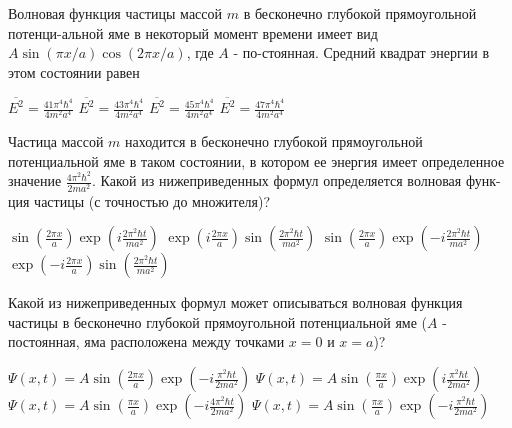 \documentclass[11pt,a4paper]{exam}
\begin{document}
\begin{questions}
\question Волновая функция частицы массой $m$ в бесконечно глубокой прямоугольной потенци-альной яме в некоторый момент времени имеет вид $A\sin (\pi x/a)\cos (2\pi x/a)$, где $A$ - по-стоянная. Средний квадрат энергии в этом состоянии равен
\begin{choices}
\choice $\overline {{E^2}}  = \frac{{41{\pi ^4}{\hbar ^4}}}{{4{m^2}{a^4}}}$  
\choice $\overline {{E^2}}  = \frac{{43{\pi ^4}{\hbar ^4}}}{{4{m^2}{a^4}}}$  
\choice $\overline {{E^2}}  = \frac{{45{\pi ^4}{\hbar ^4}}}{{4{m^2}{a^4}}}$  
\choice $\overline {{E^2}}  = \frac{{47{\pi ^4}{\hbar ^4}}}{{4{m^2}{a^4}}}$
\end{choices}

\question Частица массой $m$ находится в бесконечно глубокой прямоугольной потенциальной яме в таком состоянии, в котором ее энергия имеет определенное значение $\frac{{4{\pi ^2}{\hbar ^2}}}{{2m{a^2}}}$. Какой из нижеприведенных формул определяется волновая функ-ция частицы (с точностью до множителя)?
\begin{choices}
\choice $\sin \left( {\frac{{2\pi x}}{a}} \right)\exp \left( {i\frac{{2{\pi ^2}\hbar t}}{{m{a^2}}}} \right)$           
\choice $\exp \left( {i\frac{{2\pi x}}{a}} \right)\sin \left( {\frac{{2{\pi ^2}\hbar t}}{{m{a^2}}}} \right)$
\choice $\sin \left( {\frac{{2\pi x}}{a}} \right)\exp \left( { - i\frac{{2{\pi ^2}\hbar t}}{{m{a^2}}}} \right)$           
\choice $\exp \left( { - i\frac{{2\pi x}}{a}} \right)\sin \left( {\frac{{2{\pi ^2}\hbar t}}{{m{a^2}}}} \right)$
\end{choices}

\question Какой из нижеприведенных формул может описываться волновая функция частицы в бесконечно глубокой прямоугольной потенциальной яме ($A$ - постоянная, яма расположена между точками $x = 0$ и $x = a$)?
\begin{choices}
\choice $\Psi (x,t) = A\sin \left( {\frac{{2\pi x}}{a}} \right)\exp \left( { - i\frac{{{\pi ^2}\hbar t}}{{2m{a^2}}}} \right)$      
\choice $\Psi (x,t) = A\sin \left( {\frac{{\pi x}}{a}} \right)\exp \left( {i\frac{{{\pi ^2}\hbar t}}{{2m{a^2}}}} \right)$ 
\choice $\Psi (x,t) = A\sin \left( {\frac{{\pi x}}{a}} \right)\exp \left( { - i\frac{{4{\pi ^2}\hbar t}}{{2m{a^2}}}} \right)$      
\choice $\Psi (x,t) = A\sin \left( {\frac{{\pi x}}{a}} \right)\exp \left( { - i\frac{{{\pi ^2}\hbar t}}{{2m{a^2}}}} \right)$
\end{choices}


\end{questions}
\end{document}
